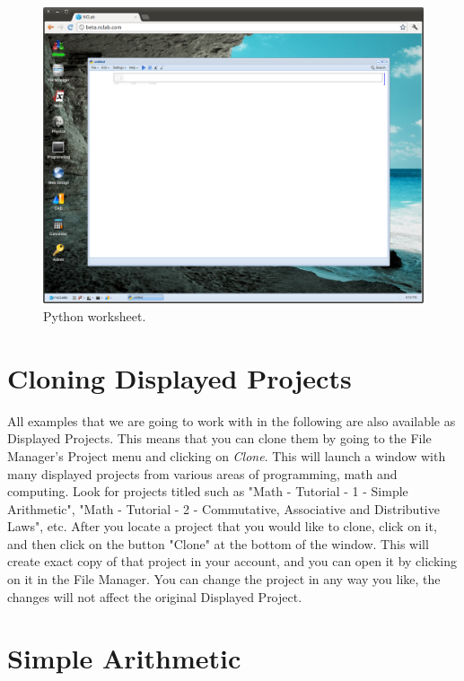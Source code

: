 \documentclass{article}
\begin{document}
\newpage

\begin{figure}[!ht]
\begin{center}
\includegraphics[width=\textwidth]{img/python.png}
\end{center}
\caption{Python worksheet.}
\label{fig:python}
\end{figure}
\noindent

\section{Cloning Displayed Projects}

All examples that we are going to work with in the following are also available 
as Displayed Projects. This means that you can clone them by going to the
File Manager's Project menu and clicking on {\em Clone}. This will launch 
a window with many displayed projects from various areas of programming,
math and computing. Look for projects titled such as "Math - Tutorial - 1 - Simple Arithmetic",
"Math - Tutorial - 2 - Commutative, Associative and Distributive Laws", etc.
After you locate a project that you would like to clone, click on it,
and then click on the button "Clone" at the bottom of the window. This will
create exact copy of that project in your account, and you can open it 
by clicking on it in the File Manager. You can change the project in any way 
you like, the changes will not affect the original Displayed Project. 

\section{Simple Arithmetic}
\end{document}
